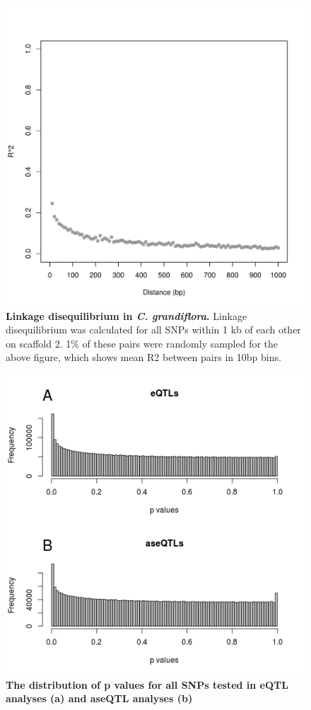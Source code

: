 \begin{figure}[ht]
      \centering
       \includegraphics[width=\linewidth]{Ch3FigS1}
    \caption{\textbf{Linkage disequilibrium in \textit{C. grandiflora}.} Linkage disequilibrium was calculated for all SNPs within 1 kb of each other on scaffold 2. 1\% of these pairs were randomly sampled for the above figure, which shows mean R2 between pairs in 10bp bins.}
    \label{fig:3figS1}
\end{figure}

\begin{figure}[ht]
      \centering
       \includegraphics[width=\linewidth]{Ch3FigS2}
    \caption{\textbf{The distribution of p values for all SNPs tested in eQTL analyses (a) and aseQTL analyses (b)}}
    \label{fig:3figS2}
\end{figure}

